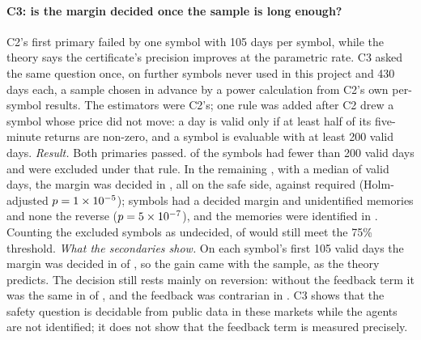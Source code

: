 \paragraph{C3: is the margin decided once the sample is long enough?} C2's first primary failed by one symbol with 105 days per symbol, while the theory says the certificate's precision improves at the parametric rate. C3 asked the same question once, on \CthreeDrawn{} further symbols never used in this project and 430 days each, a sample chosen in advance by a power calculation from C2's own per-symbol results. The estimators were C2's; one rule was added after C2 drew a symbol whose price did not move: a day is valid only if at least half of its five-minute returns are non-zero, and a symbol is evaluable with at least 200 valid days. \emph{Result.} Both primaries passed. \CthreeExcluded{} of the \CthreeDrawn{} symbols had fewer than 200 valid days and were excluded under that rule. In the remaining \CthreeSymbols{}, with a median of \CthreeDays{} valid days, the margin was decided in \CthreeDecided{}, all on the safe side, against \CthreeNeed{} required (Holm-adjusted $p=1\times10^{-5}$); \CthreeB{} symbols had a decided margin and unidentified memories and none the reverse ($p=5\times10^{-7}$), and the memories were identified in \CthreeIdentified{}. Counting the excluded symbols as undecided, \CthreeDecided{} of \CthreeDrawn{} would still meet the 75\% threshold. \emph{What the secondaries show.} On each symbol's first 105 valid days the margin was decided in \CthreeFirst{} of \CthreeSymbols{}, so the gain came with the sample, as the theory predicts. The decision still rests mainly on reversion: without the feedback term it was the same in \CthreeSameNoFb{} of \CthreeSymbols{}, and the feedback was contrarian in \CthreeFbNeg{}. C3 shows that the safety question is decidable from public data in these markets while the agents are not identified; it does not show that the feedback term is measured precisely.

